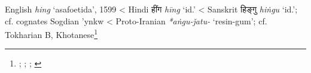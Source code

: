 \begin{etymology}\label{ety:hing}
English \textit{hing} `asafoetida', 1599
< Hindi {हींग} \textit{hīng} `id.'
< Sanskrit {हिङ्गु} \textit{hiṅgu} `id.'; cf. cognates Sogdian 'ynkw
< Proto-Iranian \textit{*aṅgu-ǰatu-} `resin-gum'; cf. Tokharian B, Khotanese\footnote{\textcite[s.v. hing]{oed}; \textcite[s.v. hing]{oed}; \textcite[87]{gharib_sogdian_1995}; \textcite[7]{adams_dictionary_2013}}
\end{etymology}